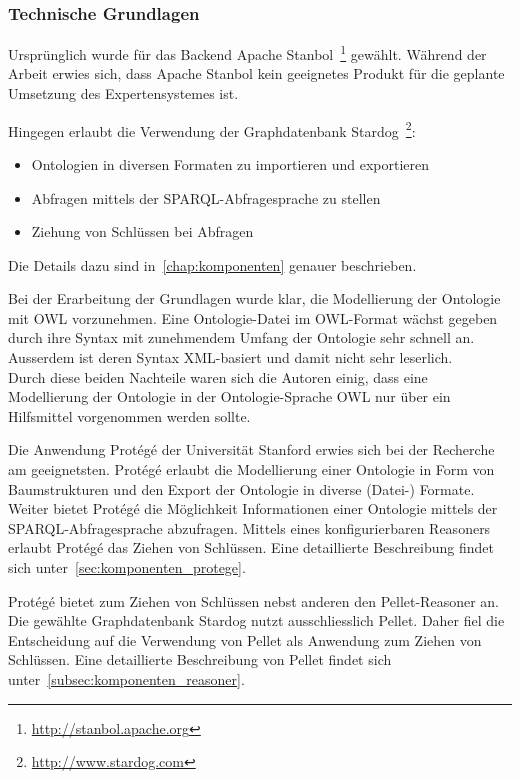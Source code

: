 \subsubsection{Technische Grundlagen}
\label{ssubsec:vorgehen:grundlagen:technisch}
Ursprünglich wurde für das Backend Apache Stanbol~\footnote{\url{http://stanbol.apache.org}} gewählt. Während der Arbeit erwies sich, dass Apache Stanbol kein geeignetes Produkt für die geplante Umsetzung des Expertensystemes ist.

Hingegen erlaubt die Verwendung der Graphdatenbank Stardog~\footnote{\url{http://www.stardog.com}}:
\begin{itemize}
    \item Ontologien in diversen Formaten zu importieren und exportieren
    \item Abfragen mittels der SPARQL-Abfragesprache zu stellen
    \item Ziehung von Schlüssen bei Abfragen
\end{itemize}
Die Details dazu sind in~\autoref{chap:komponenten} genauer beschrieben.

Bei der Erarbeitung der Grundlagen wurde klar, die Modellierung der Ontologie mit OWL vorzunehmen. Eine Ontologie-Datei im OWL-Format wächst gegeben durch ihre Syntax mit zunehmendem Umfang der Ontologie sehr schnell an. Ausserdem ist deren Syntax XML-basiert und damit nicht sehr leserlich.\\
Durch diese beiden Nachteile waren sich die Autoren einig, dass eine Modellierung der Ontologie in der Ontologie-Sprache OWL nur über ein Hilfsmittel vorgenommen werden sollte.

Die Anwendung Protégé der Universität Stanford erwies sich bei der Recherche am geeignetsten. Protégé erlaubt die Modellierung einer Ontologie in Form von Baumstrukturen und den Export der Ontologie in diverse (Datei-) Formate. Weiter bietet Protégé die Möglichkeit Informationen einer Ontologie mittels der SPARQL-Abfragesprache abzufragen. Mittels eines konfigurierbaren Reasoners erlaubt Protégé das Ziehen von Schlüssen. Eine detaillierte Beschreibung findet sich unter~\autoref{sec:komponenten_protege}.

Protégé bietet zum Ziehen von Schlüssen nebst anderen den Pellet-Reasoner an. Die gewählte Graphdatenbank Stardog nutzt ausschliesslich Pellet. Daher fiel die Entscheidung auf die Verwendung von Pellet als Anwendung zum Ziehen von Schlüssen. Eine detaillierte Beschreibung von Pellet findet sich unter~\autoref{subsec:komponenten_reasoner}.

